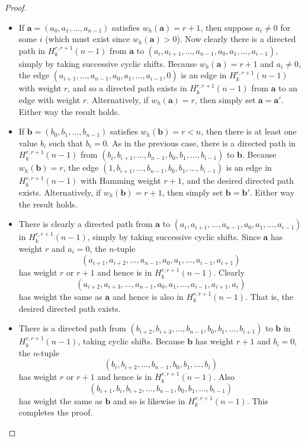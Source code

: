 \documentclass[a4paper,11pt]{article}
\theoremstyle{plain}
\theoremstyle{definition}
\theoremstyle{remark}
\begin{document}
\begin{proof}
\begin{itemize}
\item[(i)] If $\mathbf{a}=(a_0,a_1,\dots,a_{n-1})$ satisfies $w_h(\mathbf{a})=r+1$, then
    suppose $a_i\neq0$ for some $i$ (which must exist since $w_h(\mathbf{a})>0$).  Now clearly
    there is a directed path in $H_k^{r,r+1}(n-1)$ from $\mathbf{a}$ to
    $(a_i,a_{i+1},\dots,a_{n-1},a_0,a_1,\dots,a_{i-1})$, simply by taking successive cyclic
    shifts. Because $w_h(\mathbf{a})=r+1$ and $a_i\neq0$, the edge
    $(a_{i+1},\dots,a_{n-1},a_0,a_1,\dots,a_{i-1},0)$ is an edge in $H_k^{r,r+1}(n-1)$ with
    weight $r$, and so a directed path exists in $H_k^{r,r+1}(n-1)$ from $\mathbf{a}$ to an
    edge with weight $r$. Alternatively, if $w_h(\mathbf{a})=r$, then simply set
    $\mathbf{a}=\mathbf{a}'$. Either way the result holds.

\item[(ii)] If $\mathbf{b}=(b_0,b_1,\dots,b_{n-1})$ satisfies $w_h(\mathbf{b})=r<n$, then there
    is at least one value $b_i$ such that $b_i=0$.  As in the previous case, there is a
    directed path in $H_k^{r,r+1}(n-1)$ from
    $(b_i,b_{i+1},\dots,b_{n-1},b_0,b_1,\dots,b_{i-1})$ to $\mathbf{b}$. Because
    $w_h(\mathbf{b})=r$, the edge $(1,b_{i+1},\dots,b_{n-1},b_0,b_1,\dots,b_{i-1})$ is an edge
    in $H_k^{r,r+1}(n-1)$ with Hamming weight $r+1$, and the desired directed path exists.
    Alternatively, if $w_h(\mathbf{b})=r+1$, then simply set $\mathbf{b}=\mathbf{b}'$.  Either
    way the result holds.

\item[(iii)] There is clearly a directed path from $\mathbf{a}$ to
    $(a_i,a_{i+1},\dots,a_{n-1},a_0,a_1,\dots,a_{i-1})$ in $H_k^{r,r+1}(n-1)$, simply by taking
    successive cyclic shifts. Since $\mathbf{a}$ has weight $r$ and $a_i=0$, the $n$-tuple
    \[(a_{i+1},a_{i+2},\dots,a_{n-1},a_0,a_1,\dots,a_{i-1},a_{i+1})\]
    has weight $r$ or $r+1$ and hence is in $H_k^{r,r+1}(n-1)$.  Clearly
    \[(a_{i+2},a_{i+3},\dots,a_{n-1},a_0,a_1,\dots,a_{i-1},a_{i+1},a_i)\]
    has weight the same as $\mathbf{a}$ and hence is also in $H_k^{r,r+1}(n-1)$. That is, the
    desired directed path exists.

\item[(iv)] There is a directed path from
    $(b_{i+2},b_{i+3},\dots,b_{n-1},b_0,b_1,\dots,b_{i+1})$ to $\mathbf{b}$ in
    $H_k^{r,r+1}(n-1)$, taking cyclic shifts.  Because $\mathbf{b}$ has weight $r+1$ and
    $b_i=0$, the $n$-tuple
    \[(b_i,b_{i+2},\dots,b_{n-1},b_0,b_1,\dots,b_i)\]
    has weight $r$ or $r+1$ and hence is in $H_k^{r,r+1}(n-1)$.  Also
    \[(b_{i+1},b_i,b_{i+2},\dots,b_{n-1},b_0,b_1,\dots,b_{i-1})\]
    has weight the same as $\mathbf{b}$ and so is likewise in $H_k^{r,r+1}(n-1)$.  This
    completes the proof.
\end{itemize}
\end{proof}
\end{document}
